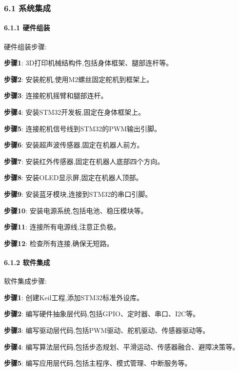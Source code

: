 \documentclass[
]{article}
\begin{document}
\hypertarget{ux7cfbux7edfux96c6ux6210}{%
\subsubsection{6.1 系统集成}\label{ux7cfbux7edfux96c6ux6210}}

\hypertarget{ux786cux4ef6ux7ec4ux88c5}{%
\paragraph{6.1.1 硬件组装}\label{ux786cux4ef6ux7ec4ux88c5}}

硬件组装步骤:

\textbf{步骤1}: 3D打印机械结构件,包括身体框架、腿部连杆等。

\textbf{步骤2}: 安装舵机,使用M2螺丝固定舵机到框架上。

\textbf{步骤3}: 连接舵机摇臂和腿部连杆。

\textbf{步骤4}: 安装STM32开发板,固定在身体框架上。

\textbf{步骤5}: 连接舵机信号线到STM32的PWM输出引脚。

\textbf{步骤6}: 安装超声波传感器,固定在机器人前方。

\textbf{步骤7}: 安装红外传感器,固定在机器人底部四个方向。

\textbf{步骤8}: 安装OLED显示屏,固定在机器人顶部。

\textbf{步骤9}: 安装蓝牙模块,连接到STM32的串口引脚。

\textbf{步骤10}: 安装电源系统,包括电池、稳压模块等。

\textbf{步骤11}: 连接所有电源线,注意正负极。

\textbf{步骤12}: 检查所有连接,确保无短路。

\hypertarget{ux8f6fux4ef6ux96c6ux6210}{%
\paragraph{6.1.2 软件集成}\label{ux8f6fux4ef6ux96c6ux6210}}

软件集成步骤:

\textbf{步骤1}: 创建Keil工程,添加STM32标准外设库。

\textbf{步骤2}: 编写硬件抽象层代码,包括GPIO、定时器、串口、I2C等。

\textbf{步骤3}: 编写驱动层代码,包括PWM驱动、舵机驱动、传感器驱动等。

\textbf{步骤4}:
编写算法层代码,包括步态规划、平滑运动、传感器融合、避障决策等。

\textbf{步骤5}: 编写应用层代码,包括主程序、模式管理、中断服务等。
\end{document}
